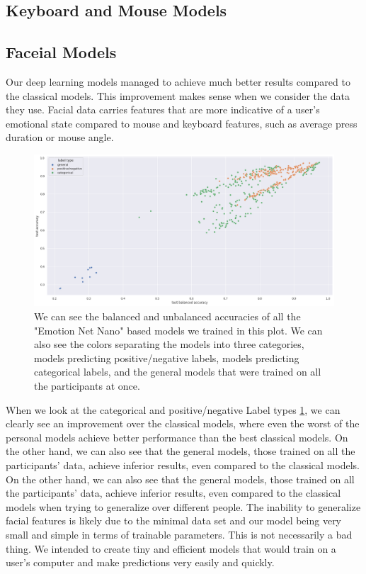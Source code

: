 
    \subsection{Keyboard and Mouse Models}


    \subsection{Faceial Models}

    Our deep learning models managed to achieve much better results compared to the classical models. 
    This improvement makes sense when we consider the data they use. Facial data carries features that are more 
    indicative of a user's emotional state compared to mouse and keyboard features, such as average press duration or mouse angle.

    \begin{figure}[htp]
        \centering
        \includegraphics[width=14cm]{figures/results/nn_acc}   
        \caption{We can see the balanced and unbalanced accuracies of all the "Emotion Net Nano" based models we trained in this plot.
        We can also see the colors separating the models into three categories, models predicting positive/negative labels, models predicting
        categorical labels, and the general models that were trained on all the participants at once.}
        \label{fig:nn_acc} 
    \end{figure}

    When we look at the categorical and positive/negative Label types \ref{fig:nn_acc}, we can clearly see an improvement over 
    the classical models, where even the worst of the personal models achieve better performance than the best classical models.
    On the other hand, we can also see that the general models, those trained on all the participants' data, achieve inferior results, 
    even compared to the classical models. On the other hand, we can also see that the general models, 
    those trained on all the participants' data, achieve inferior results, even compared to the classical models when trying 
    to generalize over different people. The inability to generalize facial features is likely due to the minimal data 
    set and our model being very small and simple in terms of trainable parameters. This is not necessarily a bad thing. 
    We intended to create tiny and efficient models that would train on a user's computer and make predictions very easily and quickly.

